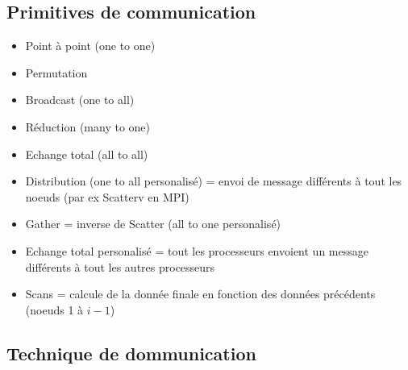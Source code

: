 \documentclass[12pt,a4paper,oneside, titlepage]{article}
\begin{document}
      \subsection*{Primitives de communication}

      \begin{itemize}
        \item Point à point (one to one)
        \item Permutation
        \item Broadcast (one to all)
        \item Réduction (many to one)
        \item Echange total (all to all)
        \item Distribution (one to all personalisé) = envoi de message différents à tout les noeuds (par ex Scatterv en MPI)
        \item Gather = inverse de Scatter (all to one personalisé)
        \item Echange total personalisé = tout les processeurs envoient un message différents à tout les autres processeurs
        \item Scans = calcule de la donnée finale en fonction des données précédents (noeuds 1 à $i-1$)
      \end{itemize}


      \subsection*{Technique de dommunication}
\end{document}
